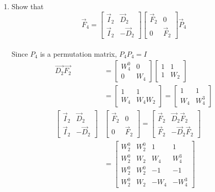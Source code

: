 \documentclass[journal,12pt,twocolumn]{IEEEtran}
\renewcommand\thesection{\arabic{section}}
\begin{document}
\begin{enumerate}[label=\arabic*.,ref=\thesection.\theenumi]
    \item Show that 
\begin{equation}
	\vec{F}_{4}=
\begin{bmatrix}
	\vec{I}_{2} & \vec{D}_{2} \\
\vec{I}_{2} & -\vec{D}_{2}
\end{bmatrix}
\begin{bmatrix}
\vec{F}_{2} & 0 \\
0 & \vec{F}_{2}
\end{bmatrix}
\vec{P}_{4}
\end{equation}\\
\solution Since $P_4$ is a permutation matrix, $P_4P_4=I$\begin{align}
\vec{D_2}\vec{F_2} &= \begin{bmatrix}
W_4^0&0\\
0&W_4
\end{bmatrix}\begin{bmatrix}
1&1\\
1&W_2
\end{bmatrix}\\
&= \begin{bmatrix}
1&1\\
W_4&W_4W_2
\end{bmatrix}=\begin{bmatrix}
1&1\\
W_4&W_4^3
\end{bmatrix}\\
    \begin{bmatrix}
	\vec{I}_{2} & \vec{D}_{2} \\
\vec{I}_{2} & -\vec{D}_{2}
\end{bmatrix}
&\begin{bmatrix}
\vec{F}_{2} & 0 \\
0 & \vec{F}_{2}
\end{bmatrix}=
\begin{bmatrix}
\vec{F}_{2} & \vec{D}_{2}\vec{F}_{2} \\
\vec{F}_{2} & -\vec{D}_{2}\vec{F}_{2}
\end{bmatrix}\\
&=\begin{bmatrix}
W_2^0 & W_2^0&1&1\\
W_2^0 & W_2&W_4& W_4^3\\
W_2^0 & W_2^0 & -1&-1 \\
W_2^0 & W_2 & -W_4& -W_4^3
\end{bmatrix} 

\end{align}
\end{enumerate}
\end{document}
